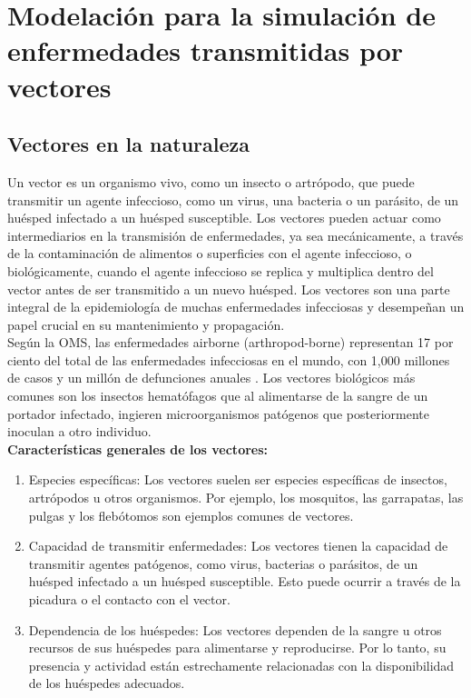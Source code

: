 \chapter{Modelación para la simulación de enfermedades transmitidas por vectores}\label{chapter:proposal}
\section{Vectores en la naturaleza}
Un vector es un organismo vivo, como un insecto o artrópodo, que puede transmitir un agente 
infeccioso, como un virus, una bacteria o un parásito, de un huésped infectado a un huésped 
susceptible. Los vectores pueden actuar como intermediarios en la transmisión de enfermedades, 
ya sea mecánicamente, a través de la contaminación de alimentos o superficies con el agente 
infeccioso, o biológicamente, cuando el agente infeccioso se replica y multiplica dentro del 
vector antes de ser transmitido a un nuevo huésped. Los vectores son una parte integral de la 
epidemiología de muchas enfermedades infecciosas y desempeñan un papel crucial en su mantenimiento 
y propagación.\autocite{Reisen2010}\\

Según la OMS, las enfermedades airborne (arthropod-borne) representan 17 por ciento del total de 
las enfermedades infecciosas en el mundo, con 1,000 millones de casos y un millón de defunciones 
anuales \autocite{OMS2020}. Los vectores biológicos más comunes son los insectos hematófagos que 
al alimentarse de la sangre de un portador infectado, ingieren microorganismos patógenos que 
posteriormente inoculan a otro individuo.\\

\textbf{Características generales de los vectores:}\autocite{OMS2020}
\begin{enumerate}
    \item Especies específicas: Los vectores suelen ser especies específicas de insectos, 
    artrópodos u otros organismos. Por ejemplo, los mosquitos, las garrapatas, las pulgas y los 
    flebótomos son ejemplos comunes de vectores. 
    \item Capacidad de transmitir enfermedades: Los vectores tienen la capacidad de transmitir 
    agentes patógenos, como virus, bacterias o parásitos, de un huésped infectado a un huésped 
    susceptible. Esto puede ocurrir a través de la picadura o el contacto con el vector.
    \item Dependencia de los huéspedes: Los vectores dependen de la sangre u otros recursos de 
    sus huéspedes para alimentarse y reproducirse. Por lo tanto, su presencia y actividad están 
    estrechamente relacionadas con la disponibilidad de los huéspedes adecuados.
\end{enumerate}
